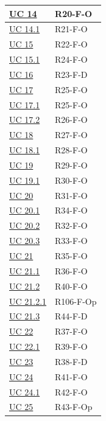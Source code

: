 {\begin{longtable}{|>{\raggedright\arraybackslash}p{3.0cm}|>{\raggedright\arraybackslash}p{12.6cm}|}
    \hyperref[uc:14]{UC 14} & \mbox{R20-F-O} \\ \hline
    \hyperref[uc:14.1]{UC 14.1} & \mbox{R21-F-O} \\ \hline
    \hyperref[uc:15]{UC 15} & \mbox{R22-F-O} \\ \hline
    \hyperref[uc:15.1]{UC 15.1} & \mbox{R24-F-O} \\ \hline
    \hyperref[uc:16]{UC 16} & \mbox{R23-F-D} \\ \hline
    \hyperref[uc:17]{UC 17} & \mbox{R25-F-O} \\ \hline
    \hyperref[uc:17.1]{UC 17.1} & \mbox{R25-F-O} \\ \hline
    \hyperref[uc:17.2]{UC 17.2} & \mbox{R26-F-O} \\ \hline
    \hyperref[uc:18]{UC 18} & \mbox{R27-F-O} \\ \hline
    \hyperref[uc:18.1]{UC 18.1} & \mbox{R28-F-O} \\ \hline
    \hyperref[uc:19]{UC 19} & \mbox{R29-F-O} \\ \hline
    \hyperref[uc:19.1]{UC 19.1} & \mbox{R30-F-O} \\ \hline
    \hyperref[uc:20]{UC 20} & \mbox{R31-F-O} \\ \hline
    \hyperref[uc:20.1]{UC 20.1} & \mbox{R34-F-O} \\ \hline
    \hyperref[uc:20.2]{UC 20.2} & \mbox{R32-F-O} \\ \hline
    \hyperref[uc:20.3]{UC 20.3} & \mbox{R33-F-O} \\ \hline
    \hyperref[uc:21]{UC 21} & \mbox{R35-F-O} \\ \hline
    \hyperref[uc:21.1]{UC 21.1} & \mbox{R36-F-O} \\ \hline
    \hyperref[uc:21.2]{UC 21.2} & \mbox{R40-F-O} \\ \hline
    \hyperref[uc:21.2.1]{UC 21.2.1} & \mbox{R106-F-Op} \\ \hline
    \hyperref[uc:21.3]{UC 21.3} & \mbox{R44-F-D} \\ \hline
    \hyperref[uc:22]{UC 22} & \mbox{R37-F-O} \\ \hline
    \hyperref[uc:22.1]{UC 22.1} & \mbox{R39-F-O} \\ \hline
    \hyperref[uc:23]{UC 23} & \mbox{R38-F-D} \\ \hline
    \hyperref[uc:24]{UC 24} & \mbox{R41-F-O} \\ \hline
    \hyperref[uc:24.1]{UC 24.1} & \mbox{R42-F-O} \\ \hline
    \hyperref[uc:25]{UC 25} & \mbox{R43-F-Op} \\ \hline

\end{longtable}}
